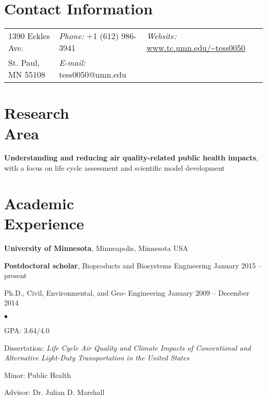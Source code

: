 \documentclass[margin,line,10pt]{res}
\newenvironment{list1}{
  \begin{list}{\ding{113}}{%
      \setlength{\itemsep}{0in}
      \setlength{\parsep}{0in} \setlength{\parskip}{0in}
      \setlength{\topsep}{0in} \setlength{\partopsep}{0in} 
      \setlength{\leftmargin}{0.17in}}}{\end{list}}
\newenvironment{list2}{
  \begin{list}{$\bullet$}{%
      \setlength{\itemsep}{0in}
      \setlength{\parsep}{0in} \setlength{\parskip}{0in}
      \setlength{\topsep}{0in} \setlength{\partopsep}{0in} 
      \setlength{\leftmargin}{0.2in}}}{\end{list}}
\begin{document}
\thispagestyle{empty}

\begin{resume}
\section{\sc Contact Information}
\vspace{.05in}
\begin{tabular}{@{}p{1.6in}p{1.7in}p{2.5in}}
1390 Eckles Ave. &
{\it Phone:} +1 (612) 986-3941 & 
{\it Website:} \url{www.tc.umn.edu/~tess0050} \\            
St. Paul, MN 55108 &
{\it E-mail:}  tess0050@umn.edu & \\     		    
\end{tabular}

\section{\sc Research\\Area}

\textbf{Understanding and reducing air quality-related public health impacts}, with a focus on life cycle assessment and scientific model development


\section{\sc Academic\\Experience}
\textbf{University of Minnesota}, Minneapolis, Minnesota USA\\

\vspace*{-.1in}

\begin{list1}
\item[] \textbf{Postdoctoral scholar}, Bioproducts and Biosystems Engineering \hfill January 2015 -- present\\

\vspace*{-.1in}

\item[] Ph.D., Civil, Environmental, and Geo- Engineering \hfill January 2009 -- December 2014\\
\begin{list2}
\vspace*{-.12in}
\item GPA: 3.64/4.0
\item Dissertation: \textit{Life Cycle Air Quality and Climate Impacts of Conventional and Alternative Light-Duty Transportation in the United States}
\item Minor: Public Health
\item Advisor:  Dr. Julian D. Marshall
\end{list2}


\end{list1}
\end{resume}
\end{document}
